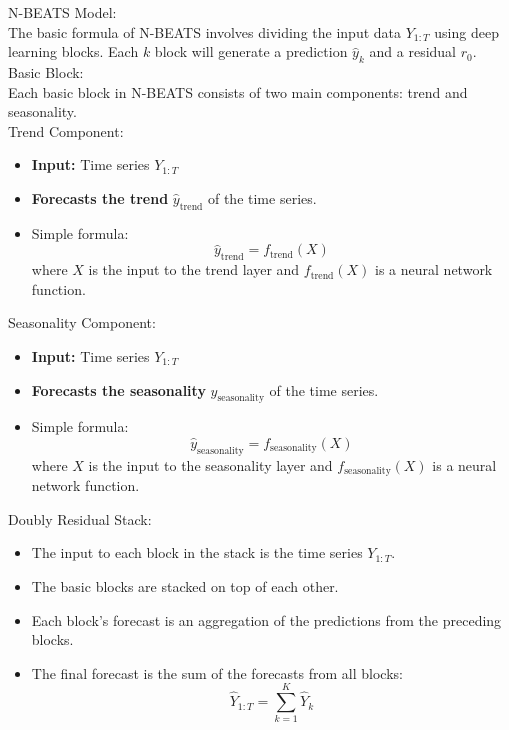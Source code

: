 \documentclass{ieeeojies}
\begin{document}
N-BEATS Model: \\
The basic formula of N-BEATS involves dividing the input data $Y_{1:T}$ using deep learning blocks. Each $k$ block will generate a prediction $\hat{y}_k$ and a residual $r_0$.
Basic Block: \\
Each basic block in N-BEATS consists of two main components: trend and seasonality. \\
Trend Component:\\
\begin{itemize}
    \item \textbf{Input:} Time series $Y_{1:T}$
    \item \textbf{Forecasts the trend} $\hat{y}_{\text{trend}}$ of the time series.
    \item Simple formula: 
    \begin{equation}
        \hat{y}_{\text{trend}} = f_{\text{trend}}(X)
    \end{equation}
    where $X$ is the input to the trend layer and $f_{\text{trend}}(X)$ is a neural network function.
\end{itemize}

Seasonality Component:\\
\begin{itemize}
    \item \textbf{Input:} Time series $Y_{1:T}$
    \item \textbf{Forecasts the seasonality} $\hat{y}_{\text{seasonality}}$ of the time series.
    \item Simple formula: 
    \begin{equation}
        \hat{y}_{\text{seasonality}} = f_{\text{seasonality}}(X)
    \end{equation}
    where $X$ is the input to the seasonality layer and $f_{\text{seasonality}}(X)$ is a neural network function.
\end{itemize}

Doubly Residual Stack:\\

\begin{itemize}
    \item The input to each block in the stack is the time series $Y_{1:T}$.
    \item The basic blocks are stacked on top of each other.
    \item Each block's forecast is an aggregation of the predictions from the preceding blocks.
    \item The final forecast is the sum of the forecasts from all blocks:
    \begin{equation}
        \hat{Y}_{1:T} = \sum_{k=1}^{K} \hat{Y}_k
    \end{equation}
\end{itemize}
\end{document}
